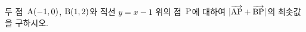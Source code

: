 두 점~$\mathrm{A}(-1{,}\mkern3mu\mathopen{}0)$, $\mathrm{B}(1{,}\mkern3mu\mathopen{}2)$와 직선 $y=x-1$ 위의 점~$\mathrm{P}$에 대하여 $|\overrightarrow{\mathrm{AP}}+\overrightarrow{\mathrm{BP}}|$의 최솟값을 구하시오.
